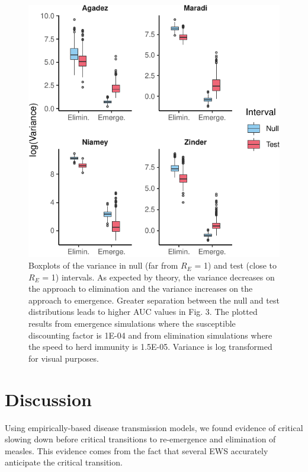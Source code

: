 \documentclass[3p]{elsarticle} %
\makeatletter
\def\maxwidth{\ifdim\Gin@nat@width>\linewidth\linewidth
\else\Gin@nat@width\fi}
\let\Oldincludegraphics\includegraphics
\renewcommand{\includegraphics}[1]{\Oldincludegraphics[width=\maxwidth]{#1}}
\makeatother
\begin{document}
\begin{figure}
\centering
\includegraphics{measles-ews-manuscript_files/figure-latex/var-ews-1.pdf}
\caption{Boxplots of the variance in null (far from \(R_E\) = 1) and
test (close to \(R_E\) = 1) intervals. As expected by theory, the
variance decreases on the approach to elimination and the variance
increases on the approach to emergence. Greater separation between the
null and test distributions leads to higher AUC values in Fig. 3. The
plotted results from emergence simulations where the susceptible
discounting factor is 1E-04 and from elimination simulations where the
speed to herd immunity is 1.5E-05. Variance is log transformed for
visual purposes. \label{var-ex}}
\end{figure}

\hypertarget{discussion}{%
\section{Discussion}\label{discussion}}

Using empirically-based disease transmission models, we found evidence
of critical slowing down before critical transitions to re-emergence and
elimination of measles. This evidence comes from the fact that several
EWS accurately anticipate the critical transition.
\end{document}
